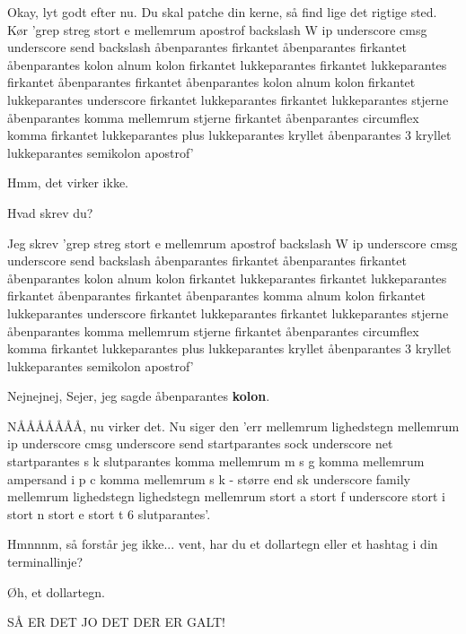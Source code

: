 \documentclass[a4paper,11pt]{article}
\begin{document}
\begin{sketch}
 Okay, lyt godt efter nu.  Du skal patche din kerne, så find
lige det rigtige sted.  Kør 'grep streg stort e mellemrum apostrof
backslash W ip underscore cmsg underscore send backslash åbenparantes
firkantet åbenparantes firkantet åbenparantes kolon alnum kolon
firkantet lukkeparantes firkantet lukkeparantes firkantet åbenparantes
firkantet åbenparantes kolon alnum kolon firkantet lukkeparantes
underscore firkantet lukkeparantes firkantet lukkeparantes stjerne
åbenparantes komma mellemrum stjerne firkantet åbenparantes circumflex
komma firkantet lukkeparantes plus lukkeparantes kryllet åbenparantes
3 kryllet lukkeparantes semikolon apostrof'

\scene{\texttt{grep -E '\textbackslash{}Wip\_cmsg\_send\textbackslash([[:alnum:]][[:alnum:]\_]*(, *[\^{},]+)\{3\};']}}

 Hmm, det virker ikke.

 Hvad skrev du?

 Jeg skrev 'grep streg stort e mellemrum apostrof backslash W
ip underscore cmsg underscore send backslash åbenparantes firkantet
åbenparantes firkantet åbenparantes kolon alnum kolon firkantet
lukkeparantes firkantet lukkeparantes firkantet åbenparantes firkantet
åbenparantes komma alnum kolon firkantet lukkeparantes underscore
firkantet lukkeparantes firkantet lukkeparantes stjerne åbenparantes
komma mellemrum stjerne firkantet åbenparantes circumflex komma
firkantet lukkeparantes plus lukkeparantes kryllet åbenparantes 3
kryllet lukkeparantes semikolon apostrof'

\scene{\texttt{grep -E '\textbackslash{}Wip\_cmsg\_send\textbackslash([[:alnum:]][[,alnum:]\_]*(, *[\^{},]+)\{3\};']}}

 Nejnejnej, Sejer, jeg sagde åbenparantes \textbf{kolon}.

 NÅÅÅÅÅÅÅ, nu virker det.  Nu siger den 'err mellemrum lighedstegn
mellemrum ip underscore cmsg underscore send startparantes sock underscore net
startparantes s k slutparantes komma mellemrum m s g komma mellemrum ampersand i
p c komma mellemrum s k - større end sk underscore family mellemrum lighedstegn
lighedstegn mellemrum stort a stort f underscore stort i stort n stort e stort t
6 slutparantes'.

 Hmnnnm, så forstår jeg ikke...  vent, har du et dollartegn
eller et hashtag i din terminallinje?


 Øh, et dollartegn.

 SÅ ER DET JO DET DER ER GALT!




\end{sketch}
\end{document}
